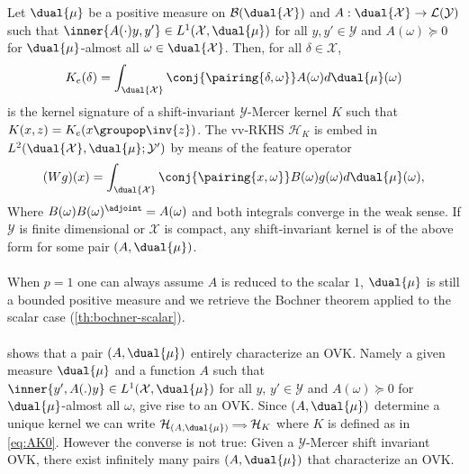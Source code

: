 \begin{proposition}
    \label{pr:mercer_kernel_bochner}
    Let $\dual{\mu}$ be a positive measure on
    $\mathcal{B}(\mathcal{\dual{\mathcal{X}}})$ and $A: \dual{\mathcal{X}}\to
    \mathcal{L}(\mathcal{Y})$ such that $\inner{A(\cdot)y,y'}\in
    L^1(\mathcal{X},\dual{\mu})$ for all $y,y'\in\mathcal{Y}$ and
    $A(\omega)\succcurlyeq 0$ for $\dual{\mu}$-almost all
    $\omega\in\dual{\mathcal{X}}$. Then, for all $\delta \in \mathcal{X}$,
    \begin{dmath}
        \label{eq:AK0}
        K_e(\delta)=\int_{\dual{\mathcal{X}}} \conj{\pairing{\delta, \omega}}
        A(\omega) d\dual{\mu}(\omega)
    \end{dmath}
    is the kernel signature of a shift-invariant $\mathcal{Y}$-Mercer kernel
    $K$ such that $K(x,z)=K_e(x \groupop \inv{z})$. The \acs{vv-RKHS}
    $\mathcal{H}_K$ is embed in
    $L^2(\dual{\mathcal{X}},\dual{\mu};\mathcal{Y}')$ by means of the feature
    operator
    \begin{dmath}
        \label{eq:feature_operator}
        (Wg)(x)=\int_{\mathcal{\dual{X}}} \conj{\pairing{x,\omega}} B(\omega)
        g(\omega) d\dual{\mu}(\omega),
    \end{dmath}
    Where $B(\omega)B(\omega)^\adjoint=A(\omega)$ and both integrals converge
    in the weak sense. If $\mathcal{Y}$ is finite dimensional or $\mathcal{X}$
    is compact, any shift-invariant kernel is of the above form for some pair
    $(A, \dual{\mu})$.
\end{proposition}
\paragraph{}
When $p=1$ one can always assume $A$ is reduced to the scalar $1$, $\dual{\mu}$
is still a bounded positive measure and we retrieve the Bochner theorem applied
to the scalar case (\cref{th:bochner-scalar}).
\paragraph{}
 shows that a pair $(A,\dual{\mu})$ entirely
characterize an \acs{OVK}. Namely a given measure $\dual{\mu}$ and a function
$A$ such that $\inner{y', A(.)y}\in L^1(\mathcal{X},\dual{\mu})$ for all $y$,
$y'\in\mathcal{Y}$ and $A(\omega)\succcurlyeq 0$ for $\dual{\mu}$-almost all
$\omega$, give rise to an \acs{OVK}. Since $(A,\dual{\mu})$ determine a unique
kernel we can write
$\mathcal{H}_{(A,\dual{\mu})}{\scriptstyle\implies}\mathcal{H}_K$ where $K$ is
defined as in \cref{eq:AK0}. However the converse is not true: Given a
$\mathcal{Y}$-Mercer shift invariant \acl{OVK}, there exist infinitely many
pairs $(A,\dual{\mu})$ that characterize an \acs{OVK}.
